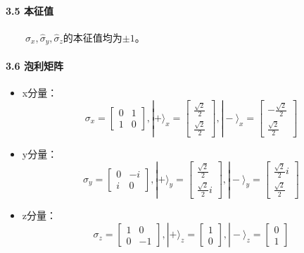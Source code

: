 \documentclass[UTF8,twocolumn]{ctexart}
\providecommand{\tightlist}{%
  \setlength{\itemsep}{0pt}\setlength{\parskip}{0pt}}
\let\oldparagraph\paragraph
\renewcommand{\paragraph}[1]{\oldparagraph{#1}\mbox{}}
\begin{document}
\hypertarget{ux672cux5f81ux503c}{%
\paragraph{ 3.5 本征值}\label{ux672cux5f81ux503c}}

  \(\hat{\sigma}_x,\hat{\sigma}_y,\hat{\sigma}_z\)的本征值均为\(\pm1\)。

\hypertarget{ux6ce1ux5229ux77e9ux9635}{%
\paragraph{ 3.6 泡利矩阵}\label{ux6ce1ux5229ux77e9ux9635}}

\begin{itemize}
\tightlist
\item
  x分量： \[\sigma_x=\left[
  \begin{matrix}
    0 & 1 \\
    1 & 0 
  \end{matrix}\right],
  |+\rangle_x=\left[
  \begin{matrix}
    \frac{\sqrt{2}}{2} \\
    \frac{\sqrt{2}}{2}
  \end{matrix}\right],
  |-\rangle_x=\left[
  \begin{matrix}
    -\frac{\sqrt{2}}{2} \\
    \frac{\sqrt{2}}{2}
  \end{matrix}\right]\]
\item
  y分量： \[\sigma_y=\left[
  \begin{matrix}
    0 & -i \\
    i & 0 
  \end{matrix}\right],
  |+\rangle_y=\left[
  \begin{matrix}
    \frac{\sqrt{2}}{2} \\
    \frac{\sqrt{2}}{2}i
  \end{matrix}\right],
  |-\rangle_y=\left[
  \begin{matrix}
    \frac{\sqrt{2}}{2}i \\
    \frac{\sqrt{2}}{2}
  \end{matrix}\right]\]
\item
  z分量： \[\sigma_z=\left[
  \begin{matrix}
    1 & 0 \\
    0 & -1 
  \end{matrix}\right],
  |+\rangle_z=\left[
  \begin{matrix}
    1 \\
    0
  \end{matrix}\right],
  |-\rangle_z=\left[
  \begin{matrix}
    0 \\
    1
  \end{matrix}\right]\]
\end{itemize}
\end{document}
